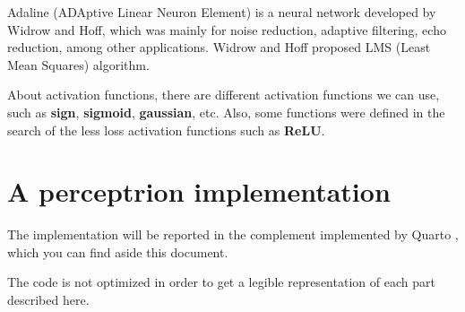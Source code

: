 \documentclass[10pt]{IEEEtran}
\begin{document}
Adaline (ADAptive Linear Neuron Element) is a neural network developed by
Widrow and Hoff, which was mainly for noise reduction, adaptive filtering,
echo reduction, among other applications. Widrow and Hoff proposed LMS
(Least Mean Squares) algorithm.

About activation functions, there are different activation functions we
can use, such as \textbf{sign}, \textbf{sigmoid}, \textbf{gaussian}, etc.
Also, some functions were defined in the search of the less loss
activation functions such as \textbf{ReLU}.


\section{A perceptrion implementation}

The implementation will be reported in the complement implemented by
Quarto \cite{QUARTOWELCOME,QUARTOGUIDE,QUARTODOCUMENTATION}, which you can
find aside this document.

The code is not optimized in order to get a legible representation of each
part described here.


\printbibliography%
\end{document}
